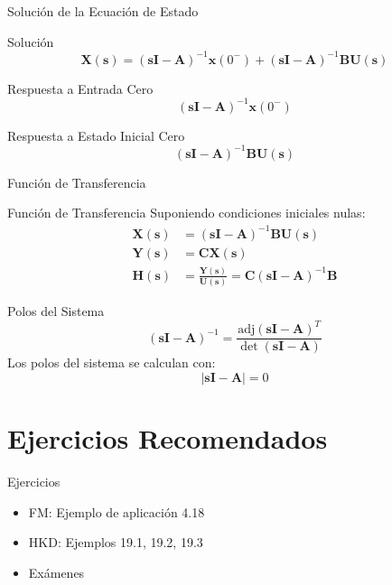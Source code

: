 \documentclass[aspectratio=169, usenames,svgnames,dvipsnames]{beamer}
\newcommand{\laplace}[1]{\mathbf{#1}(\mathbf{s})}
\newcommand{\slp}{\mathbf{s}}
\begin{document}
\begin{frame}[label={sec:orgc50ae4d}]{Solución de la Ecuación de Estado}
\begin{block}{Solución}
\[
  \laplace{X} = \left(\slp \mathbf{I} - \mathbf{A} \right)^{-1} \mathbf{x}(0^-) + \left(\slp \mathbf{I} - \mathbf{A} \right)^{-1} \mathbf{B}\laplace{U}
\]
\end{block}

\begin{block}{Respuesta a Entrada Cero}
\[
  \left(\slp \mathbf{I} - \mathbf{A} \right)^{-1} \mathbf{x}(0^-)
\]
\end{block}

\begin{block}{Respuesta a Estado Inicial Cero}
\[
  \left(\slp \mathbf{I} - \mathbf{A} \right)^{-1} \mathbf{B}\laplace{U}
\]
\end{block}
\end{frame}

\begin{frame}[label={sec:org634e302}]{Función de Transferencia}
\begin{block}{Función de Transferencia}
Suponiendo condiciones iniciales nulas:
\begin{align*}
  \laplace{X} &= \left(\slp \mathbf{I} - \mathbf{A} \right)^{-1} \mathbf{B} \laplace{U}\\
  \laplace{Y} &= \mathbf{C} \laplace{X}\\
  \laplace{H} &= \frac{\laplace{Y}}{\laplace{U}}  = \mathbf{C} \left(\slp \mathbf{I} - \mathbf{A} \right)^{-1} \mathbf{B}
\end{align*}
\end{block}

\begin{block}{Polos del Sistema}
\[
  \left(\slp \mathbf{I} - \mathbf{A} \right)^{-1} = \frac{\text{adj}(\slp \mathbf{I} - \mathbf{A})^T}{\det(\slp \mathbf{I} - \mathbf{A})}
\]
Los polos del sistema se calculan con:
\[
|\slp \mathbf{I} - \mathbf{A}| = 0
\]
\end{block}
\end{frame}
\section{Ejercicios Recomendados}
\label{sec:orgfdffdda}

\begin{frame}[label={sec:org5f8ebd9}]{Ejercicios}
\begin{itemize}
\item FM: Ejemplo de aplicación 4.18
\item HKD: Ejemplos 19.1, 19.2, 19.3
\item Exámenes
\end{itemize}
\end{frame}
\end{document}
